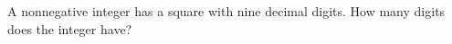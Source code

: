 A nonnegative integer has a square with nine decimal digits. How many digits does the integer have?
